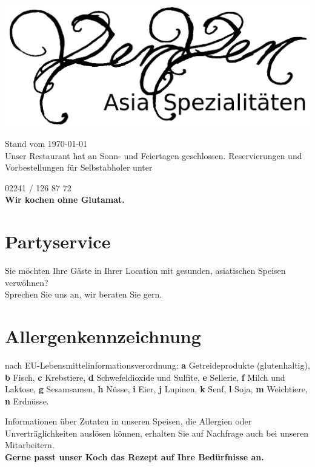 \documentclass[a4paper,10pt,notumble]{leaflet}
\begin{document}
 

\begin{center}
\includegraphics[width=\textwidth]{gfx/yenyen_head_bw_text.png}
\end{center}

{\small Stand vom \today}\\[4mm]
Unser Restaurant hat an Sonn- und Feiertagen geschlossen. \mbox{Reservierungen} und Vorbestellungen für Selbstabholer unter
\begin{center}
{\Huge 02241 / 126 87 72}\\
\textbf{Wir kochen ohne Glutamat.}
\end{center}

\section*{Partyservice}
Sie möchten Ihre Gäste in Ihrer Location mit gesunden, asiatischen Speisen verwöhnen?\\ 
Sprechen Sie uns an, wir beraten Sie gern.

\section*{Allergenkennzeichnung}
nach EU-Lebensmittelinformationsverordnung: 
\textbf{a} Getreideprodukte (glutenhaltig), 
\textbf{b} Fisch,
\textbf{c} Krebstiere,
\textbf{d} Schwefeldioxide und Sulfite,
\textbf{e} Sellerie,
\textbf{f} Milch und Laktose,
\textbf{g} Sesamsamen,
\textbf{h} Nüsse,
\textbf{i} Eier,
\textbf{j} Lupinen,
\textbf{k} Senf,
\textbf{l} Soja,
\textbf{m} Weichtiere,
\textbf{n} Erdnüsse. 

Informationen über Zutaten in unseren Speisen, die Allergien
oder Unverträglichkeiten auslösen können, erhalten Sie auf Nachfrage
auch bei unseren Mitarbeitern.\\
\textbf{Gerne passt unser Koch das Rezept auf Ihre Bedürfnisse an.} %
\end{document}
